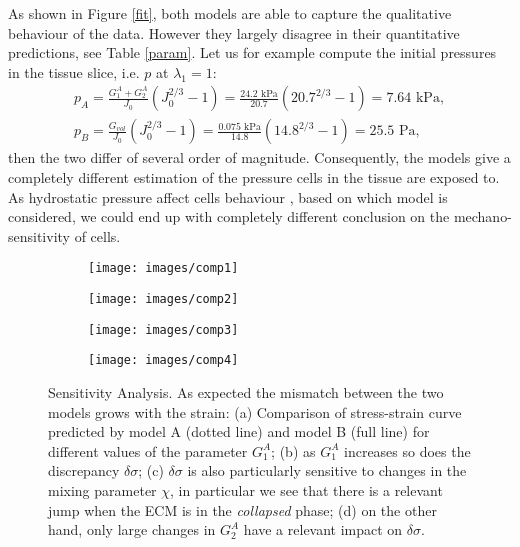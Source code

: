 As shown in Figure \ref{fit}, both models are able to capture the qualitative behaviour of the data. However they largely disagree in their quantitative predictions, see Table \ref{param}. Let us for example compute the initial pressures in the tissue slice, i.e. $p$ at $\lambda_1=1$:  
\begin{gather}
p_A = \frac{G^A_1+G^A_2}{J_0}(J_0^{2/3}-1) = \frac{24.2 \text{ kPa}}{20.7}(20.7^{2/3}-1) = 7.64 \text{ kPa},\\
p_B = \frac{G_{vol}}{J_0}(J_0^{2/3}-1) = \frac{0.075 \text{ kPa}}{14.8}(14.8^{2/3}-1) = 25.5 \text{ Pa},
\end{gather}
then the two differ of several order of magnitude. Consequently, the models give a completely different estimation of the pressure cells in the tissue are exposed to. As hydrostatic pressure affect cells behaviour \cite{viscocell}, based on which model is considered, we could end up with completely different conclusion on the mechano-sensitivity of cells.
\begin{figure}[h!]
	\begin{subfigure}{0.49\textwidth}
		\texttt{[image: images/comp1]}
		\caption{}
	\end{subfigure}
	\begin{subfigure}{0.49\textwidth}
		\texttt{[image: images/comp2]}
		\caption{}
	\end{subfigure}
	
	\begin{subfigure}{0.49\textwidth}
		\texttt{[image: images/comp3]}
		\caption{}
	\end{subfigure}
	\begin{subfigure}{0.49\textwidth}
		\texttt{[image: images/comp4]}
		\caption{}
	\end{subfigure}
	\caption{Sensitivity Analysis. As expected the mismatch between the two models grows with the strain: (a) Comparison of stress-strain curve predicted by model A (dotted line) and model B (full line) for different values of the parameter $G^A_1$; (b) as $G_1^A$ increases so does the discrepancy $\delta\sigma$; (c) $\delta\sigma$ is also particularly sensitive to changes in the mixing parameter $\chi$, in particular we see that there is a relevant jump when the ECM is in the \textit{collapsed} phase; (d) on the other hand, only large changes in $G^A_2$ have a relevant impact on $\delta\sigma$.}
	\label{comp3}
\end{figure}

